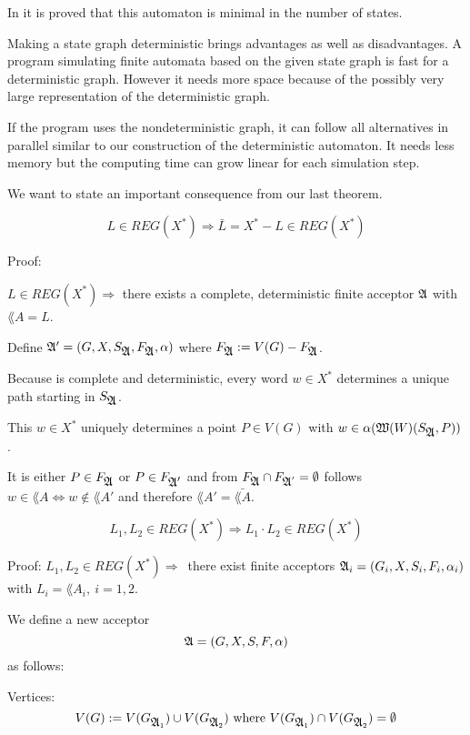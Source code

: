In \cite{Commentz} it is proved that this automaton is minimal in the number of
states.

Making a state graph deterministic brings advantages as well as disadvantages. A
program simulating finite automata based on the given state graph is fast for
a deterministic graph. However it needs more space because of the possibly very
large representation of the deterministic graph.

If the program uses the nondeterministic graph, it can follow all alternatives
in parallel similar to our construction of the deterministic automaton. It needs
less memory but the computing time can grow linear for each simulation step.

We want to state an important consequence from our last theorem.

\begin{theorem}
\[ L \in REG(X^*) \Rightarrow \bar{L} = X^* - L \in REG(X^*) \]
\end{theorem}

Proof: 

$L \in REG(X^*) \Rightarrow $ there exists a complete, deterministic
finite acceptor $\mbox{$\mathfrak{A}$}$ with $\lang{A} = L$.

Define $\mbox{$\mathfrak{A'}$} = (G, X, S_{\mbox{$\mathfrak{A}$}}, F_{\mbox{$\mathfrak{A}$}}, \alpha)$ where $F_{\mbox{$\mathfrak{A}$}} :=
V(G) - F_{\mbox{$\mathfrak{A}$}}$.

Because  is complete and deterministic, every word $w \in X^*$ determines
a unique path starting in $S_{\mbox{$\mathfrak{A}$}}$.

This $w \in X^*$ uniquely determines a point $P \in V(G)$ with $w \in
\alpha(\mbox{$\mathfrak{W}(W)$}(S_{\mbox{$\mathfrak{A}$}}, P))$.

It is either $P \in F_{\mbox{$\mathfrak{A}$}}$ or $P \in F_{\mbox{$\mathfrak{A'}$}}$ and from $F_{\mbox{$\mathfrak{A}$}}
\cap F_{\mbox{$\mathfrak{A}$}'} = \emptyset$ follows $w \in \lang{A} \Leftrightarrow w
\notin \lang{A'}$ and therefore $\lang{A'} = \bar{\lang{A}}$.

\begin{theorem}
\[ L_1, L_2 \in REG(X^*) \Rightarrow L_1 \cdot L_2 \in REG(X^*) \]
\end{theorem}

Proof: $L_1, L_2 \in REG(X^*) \Rightarrow$\ there exist finite acceptors
$\mbox{$\mathfrak{A}$}_i = (G_i, X, S_i, F_i, \alpha_i)$ with $L_i = \lang{A}_i,\ i = 1,2$.

We define a new acceptor
\[\mbox{$\mathfrak{A}$} = (G, X, S, F, \alpha) \]
as follows:

Vertices:
\[ V(G) := V(G_{\mbox{$\mathfrak{A}$}_1}) \cup V(G_{\mbox{$\mathfrak{A}$}_2})\mbox{ where }V(G_{\mbox{$\mathfrak{A}$}_1})
\cap V(G_{\mbox{$\mathfrak{A}$}_2}) = \emptyset \]


